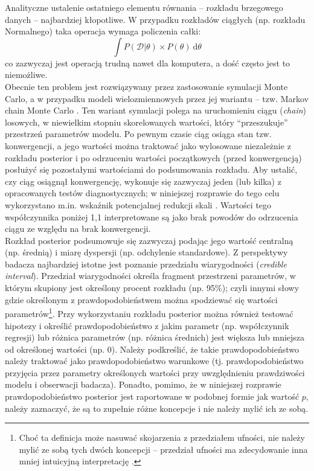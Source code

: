 \documentclass[man]{apa6}
\begin{document}
Analityczne ustalenie ostatniego elementu równania -- rozkładu brzegowego danych -- najbardziej kłopotliwe. W przypadku rozkładów ciągłych (np. rozkładu Normalnego) taka operacja wymaga policzenia całki:
\begin{equation}
    \int P(\mathcal{D} | \theta)\times P(\theta)\ \mathrm{d}\theta
\end{equation}
co zazwyczaj jest operacją trudną nawet dla komputera, a dość często jest to niemożliwe. \\

Obecnie ten problem jest rozwiązywany przez zastosowanie symulacji Monte Carlo, a w przypadku modeli wielozmiennowych przez jej wariantu -- tzw. Markov chain Monte Carlo \parencite[MCMC,][]{hastings1970monte}. Ten wariant symulacji polega na uruchomieniu ciągu (\emph{chain}) losowych, w niewielkim stopniu skorelowanych wartości, który ``przeszukuje'' przestrzeń parametrów modelu. Po pewnym czasie ciąg osiąga stan tzw. konwergencji, a jego wartości można traktować jako wylosowane niezależnie z rozkładu posterior i po odrzuceniu wartości początkowych (przed konwergencją) posłużyć się pozostałymi wartościami do podsumowania rozkładu. Aby ustalić, czy ciąg osiągnął konwergencję, wykonuje się zazwyczaj jeden (lub kilka) z opracowanych testów diagnostycznych; w niniejszej rozprawie do tego celu wykorzystano m.in. wskaźnik potencjalnej redukcji skali \parencite[\emph{potential scale reduction factor},][]{gelman1992inference}. Wartości tego współczynnika poniżej 1,1 interpretowane są jako brak powodów do odrzucenia ciągu ze względu na brak konwergencji.\\

Rozkład posterior podsumowuje się zazwyczaj podając jego wartość centralną (np. średnią) i miarę dyspersji (np. odchylenie standardowe). Z perspektywy badacza najbardziej istotne jest poznanie przedziału wiarygodności (\emph{credible interval}). Przedział wiarygodności określa fragment przestrzeni parametrów, w którym skupiony jest określony procent rozkładu (np. 95\%); czyli innymi słowy gdzie określonym z prawdopodobieństwem można spodziewać się wartości parametrów\footnote{Choć ta definicja może nasuwać skojarzenia z przedziałem ufności, nie należy mylić ze sobą tych dwóch koncepcji -- przedział ufności ma zdecydowanie inna mniej intuicyjną interpretację \parencite[zob. np.,][]{gill2014bayesian}.}. Przy wykorzystaniu rozkładu posterior można również testować hipotezy i określić prawdopodobieństwo z jakim parametr (np. współczynnik regresji) lub różnica parametrów (np. różnica średnich) jest większa lub mniejsza od określonej wartości (np. 0). Należy podkreślić, że takie prawdopodobieństwo należy traktować jako prawdopodobieństwo warunkowe (tj. prawdopodobieństwo przyjęcia przez parametry określonych wartości przy uwzględnieniu prawdziwości modelu i obserwacji badacza). Ponadto, pomimo, że w niniejszej rozprawie prawdopodobieństwo posterior jest raportowane w podobnej formie jak wartość $p$, należy zaznaczyć, że są to zupełnie różne koncepcje i nie należy mylić ich ze sobą.
\end{document}
